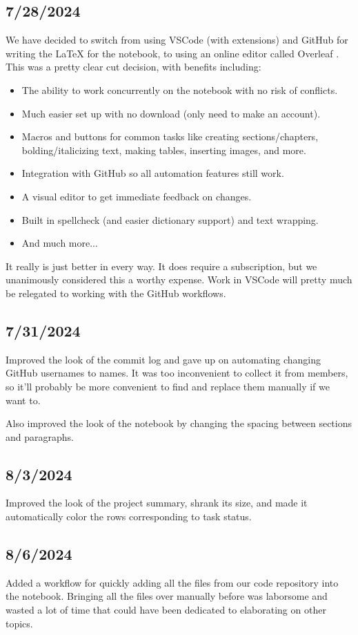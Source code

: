 \subsection{7/28/2024}
We have decided to switch from using VSCode (with extensions) and GitHub for
writing the \LaTeX{} for the notebook, to using an online editor called Overleaf
\cite{bib:overleaf}. This was a pretty clear cut decision, with benefits
including:
\begin{itemize}
      \item The ability to work concurrently on the notebook with no risk of
            conflicts.
      \item Much easier set up with no download (only need to make an account).
      \item Macros and buttons for common tasks like creating sections/chapters,
            bolding/italicizing text, making tables, inserting images, and more.
      \item Integration with GitHub so all automation features still work.
      \item A visual editor to get immediate feedback on changes.
      \item Built in spellcheck (and easier dictionary support) and text wrapping.
      \item And much more...
\end{itemize}
It really is just better in every way. It does require a subscription, but we
unanimously considered this a worthy expense. Work in VSCode will pretty much
be relegated to working with the GitHub workflows.
\subsection{7/31/2024}
Improved the look of the commit log and gave up on automating changing GitHub
usernames to names. It was too inconvenient to collect it from members, so it'll
probably be more convenient to find and replace them manually if we want to.
\par Also improved the look of the notebook by changing the spacing between
sections and paragraphs.
\subsection{8/3/2024}
Improved the look of the project summary, shrank its size, and made it automatically
color the rows corresponding to task status.
\subsection{8/6/2024}
Added a workflow for quickly adding all the files from our code repository into the
notebook. Bringing all the files over manually before was laborsome and wasted a lot
of time that could have been dedicated to elaborating on other topics.
